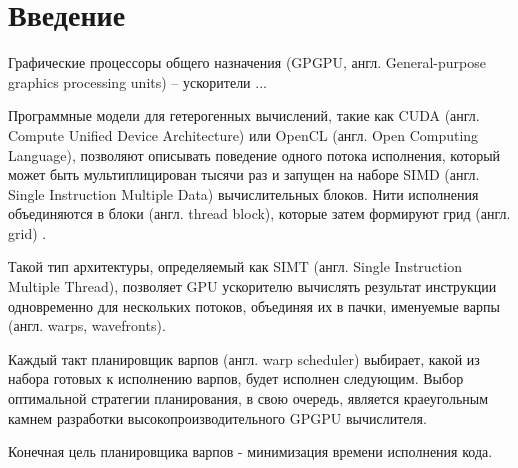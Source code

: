 \section{Введение}

Графические процессоры общего назначения (GPGPU, англ. General-purpose graphics processing units) -- ускорители ...

Программные модели для гетерогенных вычислений, такие как CUDA (англ. Compute Unified Device Architecture)\cite{CUDA_Article} или OpenCL (англ. Open Computing Language), позволяют описывать поведение одного потока исполнения, который может быть мультиплицирован тысячи раз и запущен на наборе SIMD (англ. Single Instruction Multiple Data) вычислительных блоков. Нити исполнения объединяются в блоки (англ. thread block), которые затем формируют грид (англ. grid) \cite{CUDA_C_Programming_Guide}. 

Такой тип архитектуры, определяемый как SIMT (англ. Single Instruction Multiple Thread), позволяет GPU ускорителю вычислять результат инструкции одновременно для нескольких потоков, объединяя их в пачки, именуемые варпы (англ. warps, wavefronts). 





Каждый такт планировщик варпов (англ. warp scheduler) выбирает, какой из набора готовых к исполнению варпов, будет исполнен следующим. Выбор оптимальной стратегии планирования, в свою очередь, является краеугольным камнем разработки высокопроизводительного GPGPU вычислителя.

Конечная цель планировщика варпов - минимизация времени исполнения кода. 
